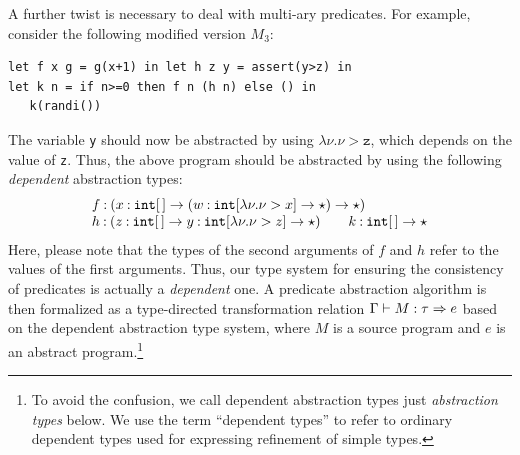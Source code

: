 A further twist is necessary to deal with multi-ary predicates.
For example, consider the following modified version \(M_3\):
\begin{verbatim}
let f x g = g(x+1) in let h z y = assert(y>z) in
let k n = if n>=0 then f n (h n) else () in
   k(randi())
\end{verbatim}
The variable \texttt{y} should now be abstracted by using %
\(\lambda \nu.\nu>\texttt{z}\), which 
depends on the value of \texttt{z}. Thus, %
the above program should be abstracted by using the following \emph{dependent} abstraction types:
\[
\begin{array}{l}
f\mathbin{:} (x\mathbin{:}\mathtt{int}[\,] \rightarrow (w\mathbin{:}\mathtt{int}[\lambda \nu.\nu> x] \rightarrow \star) \rightarrow \star) \\
h\mathbin{:} (z\mathbin{:}\mathtt{int}[\,] \rightarrow y\mathbin{:}\mathtt{int}[\lambda \nu.\nu> z] \rightarrow \star)\qquad
k\mathbin{:} \mathtt{int}[\,]\rightarrow\star
\end{array}
\]
Here, please note that the types of the second arguments of \(f\) and 
\(h\) refer to the values of the first arguments. Thus, our type system 
for ensuring the consistency of predicates is actually a \emph{dependent} 
one. A predicate abstraction algorithm is then formalized as a 
type-directed transformation relation \(\Gamma \vdash M:\tau \Rightarrow e\) 
based on the dependent abstraction type system, where \(M\) is a source 
program and \(e\) is an abstract program.\footnote{To avoid the 
confusion, we call dependent abstraction types just \emph{abstraction 
types} below. We use the term ``dependent types'' to refer to ordinary 
dependent types 
used for expressing refinement of simple types.}

